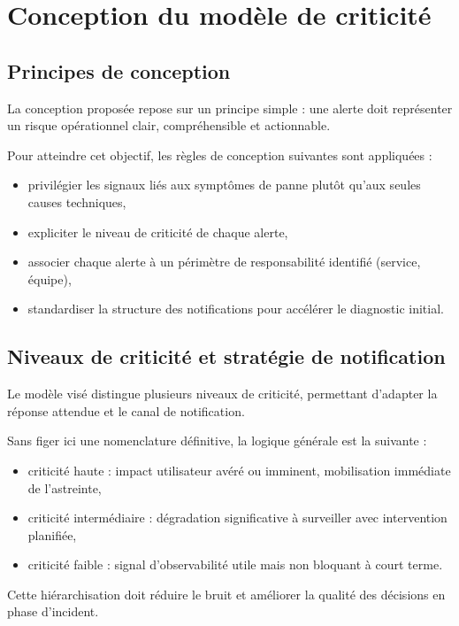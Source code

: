 \chapter{Conception du modèle de criticité}

\section{Principes de conception}

La conception proposée repose sur un principe simple : une alerte doit représenter un risque opérationnel clair,
compréhensible et actionnable.

Pour atteindre cet objectif, les règles de conception suivantes sont appliquées :
\begin{itemize}
	\item privilégier les signaux liés aux symptômes de panne plutôt qu'aux seules causes techniques,
	\item expliciter le niveau de criticité de chaque alerte,
	\item associer chaque alerte à un périmètre de responsabilité identifié (service, équipe),
	\item standardiser la structure des notifications pour accélérer le diagnostic initial.
\end{itemize}

\section{Niveaux de criticité et stratégie de notification}

Le modèle visé distingue plusieurs niveaux de criticité, permettant d'adapter la réponse attendue et le canal de
notification.

Sans figer ici une nomenclature définitive, la logique générale est la suivante :
\begin{itemize}
	\item criticité haute : impact utilisateur avéré ou imminent, mobilisation immédiate de l'astreinte,
	\item criticité intermédiaire : dégradation significative à surveiller avec intervention planifiée,
	\item criticité faible : signal d'observabilité utile mais non bloquant à court terme.
\end{itemize}

Cette hiérarchisation doit réduire le bruit et améliorer la qualité des décisions en phase d'incident.

